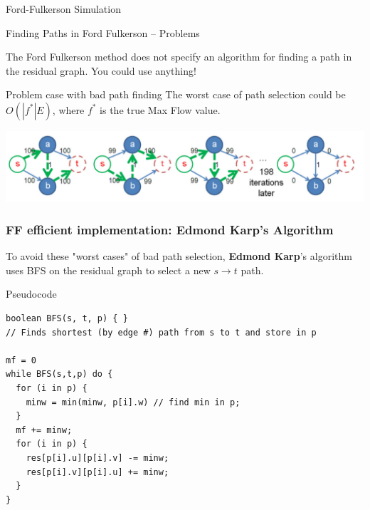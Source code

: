 \begin{frame}{Ford-Fulkerson Simulation}
  \vspace{10cm}
\end{frame}

\begin{frame}{Finding Paths in Ford Fulkerson -- Problems}

The Ford Fulkerson method does not specify an algorithm for finding a path in the residual graph. You could use anything!\bigskip

\begin{exampleblock}{Problem case with bad path finding}
  The worst case of path selection could be $O(|f^*|E)$, where $f^*$ is the true Max Flow value.\medskip

  \includegraphics[width=1\textwidth]{../img/ff_worst_halim}
\end{exampleblock}
\end{frame}

\begin{frame}[fragile]
  \frametitle{FF efficient implementation: Edmond Karp's Algorithm}

  \begin{block}{}
    To avoid these "worst cases" of bad path selection, {\bf Edmond Karp}'s algorithm uses BFS on the residual graph to select a new $s\to t$ path.
  \end{block}

{\smaller
\begin{block}{Pseudocode}
\begin{verbatim}
boolean BFS(s, t, p) { }
// Finds shortest (by edge #) path from s to t and store in p

mf = 0
while BFS(s,t,p) do {
  for (i in p) {
    minw = min(minw, p[i].w) // find min in p;
  }
  mf += minw;
  for (i in p) {
    res[p[i].u][p[i].v] -= minw;
    res[p[i].v][p[i].u] += minw;
  }
}
\end{verbatim}
\end{block}
}
\end{frame}


